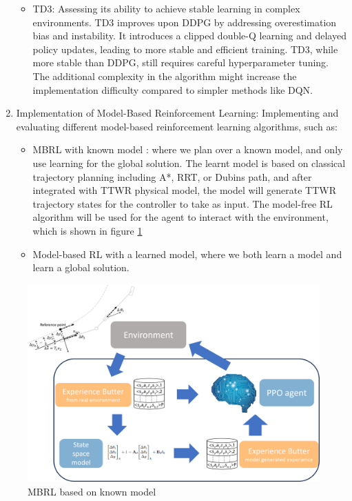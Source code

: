 \begin{enumerate}
\begin{itemize}
     \item TD3: Assessing its ability to achieve stable learning in complex environments. TD3 improves upon DDPG by addressing overestimation bias and instability. It introduces a clipped double-Q learning and delayed policy updates, leading to more stable and efficient training. TD3, while more stable than DDPG, still requires careful hyperparameter tuning. The additional complexity in the algorithm might increase the implementation difficulty compared to simpler methods like DQN.
   \end{itemize}
   \item Implementation of Model-Based Reinforcement Learning: Implementing and evaluating different model-based reinforcement learning algorithms, such as:
   \begin{itemize}
     \item MBRL with known model \cite{sprayberry2023data}: where we plan over a known model, and only use learning for the global solution. The learnt model is based on classical trajectory planning including A*, RRT, or Dubins path, and after integrated with TTWR physical model, the model will generate TTWR trajectory states for the controller to take as input. The model-free RL algorithm will be used for the agent to interact with the environment, which is shown in figure \ref{fig: MBRL based on known model}
     \item Model-based RL with a learned model, where we both learn a model and learn a global solution.
   \end{itemize}
\end{enumerate}

\begin{figure}[h]
\centering
\includegraphics[width=0.8\linewidth]{fig/known mbrl schema.png}
\caption{MBRL based on known model}
\label{fig: MBRL based on known model}
\end{figure}

